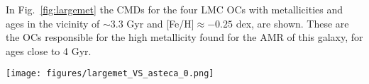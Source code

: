 \documentclass{aa}
\begin{document}
\begin{appendix}
In Fig.~\ref{fig:largemet} the CMDs for the four LMC OCs with metallicities and
ages in the vicinity of ${\sim}3.3$ Gyr and [Fe/H]${\approx-0.25}$ dex, are
shown. These are the OCs responsible for the high metallicity found for the AMR
of this galaxy, for ages close to 4 Gyr.
%
\begin{figure*}
\texttt{[image: figures/largemet\_VS\_asteca\_0.png]}
\caption{CMDs for the OCs that cause a peak in the AMR for the LMC, for ages
close to 4 Gyr.
The best match synthetic cluster is plotted to the right, and the observed
cluster region CMD to the left, for each OC.}
\label{fig:largemet}
\end{figure*}

\end{appendix} 
\end{document}
